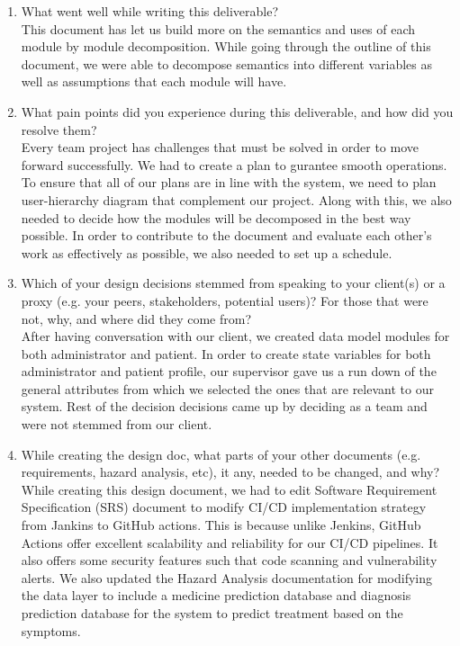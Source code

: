 \documentclass[12pt, titlepage]{article}
\begin{document}
\begin{enumerate}
  \item What went well while writing this deliverable?\\
  This document has let us build more on the semantics and uses of each module by module decomposition. While going through the outline of this document, we were able to decompose semantics into different variables as well as assumptions that each module will have.

  \item What pain points did you experience during this deliverable, and how did you resolve them?\\
  Every team project has challenges that must be solved in order to move forward successfully. We had to create a plan to gurantee smooth operations. To ensure that all of our plans are in line with the system, we need to plan user-hierarchy diagram that complement our project. Along with this, we also needed to decide how the modules will be decomposed in the best way possible. In order to contribute to the document and evaluate each other’s work as effectively as possible, we also needed to set up a schedule. 

  \item Which of your design decisions stemmed from speaking to your client(s) or a proxy (e.g. your peers, stakeholders, potential users)? For those that were not, why, and where did they come from?\\
  After having conversation with our client, we created data model modules for both administrator and patient. In order to create state variables for both administrator and patient profile, our supervisor gave us a run down of the general attributes from which we selected the ones that are relevant to our system. Rest of the decision decisions came up by deciding as a team and were not stemmed from our client.  

  \item While creating the design doc, what parts of your other documents (e.g. requirements, hazard analysis, etc), it any, needed to be changed, and why?\\
  While creating this design document, we had to edit Software Requirement Specification (SRS) document to modify CI/CD implementation strategy from Jankins to GitHub actions. This is because unlike Jenkins, GitHub Actions offer excellent scalability and reliability for our CI/CD pipelines. It also offers some security features such that code scanning and vulnerability alerts. We also updated the Hazard Analysis documentation for modifying the data layer to include a medicine prediction database and diagnosis prediction database for the system to predict treatment based on the symptoms.  


\end{enumerate}
\end{document}
